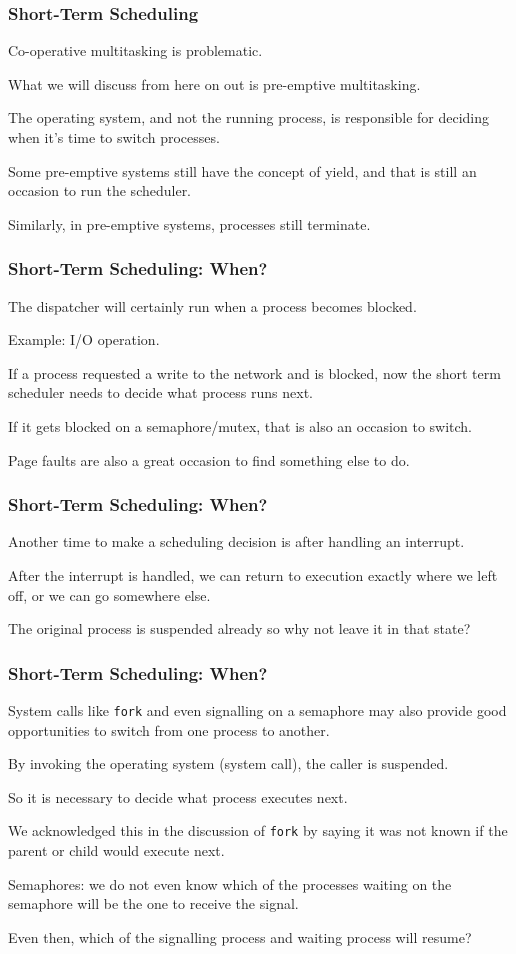 \begin{frame}
\frametitle{Short-Term Scheduling}

Co-operative multitasking is problematic. 

What we will discuss from here on out is \alert{pre-emptive multitasking}.

The operating system, and not the running process, is responsible for deciding when it's time to switch processes. 

Some pre-emptive systems still have the concept of yield, and that is still an occasion to run the scheduler. 

Similarly, in pre-emptive systems, processes still terminate.


\end{frame}

\begin{frame}
\frametitle{Short-Term Scheduling: When?}

The dispatcher will certainly run when a process becomes blocked.

Example: I/O operation. 

If a process requested a write to the network and is blocked, now the short term scheduler needs to decide what process runs next. 

If it gets blocked on a semaphore/mutex, that is also an occasion to switch.

Page faults are also a great occasion to find something else to do.


\end{frame}

\begin{frame}
\frametitle{Short-Term Scheduling: When?}

Another time to make a scheduling decision is after handling an interrupt.

After the interrupt is handled, we can return to execution exactly where we left off, or we can go somewhere else.

The original process is suspended already so why not leave it in that state?

\end{frame}

\begin{frame}
\frametitle{Short-Term Scheduling: When?}

System calls like \texttt{fork} and even signalling on a semaphore may also provide good opportunities to switch from one process to another. 

By invoking the operating system (system call), the caller is suspended.

So it is necessary to decide what process executes next. 

We acknowledged this in the discussion of \texttt{fork} by saying it was not known if the parent or child would execute next. 

Semaphores: we do not even know which of the processes waiting on the semaphore will be the one to receive the signal. 

Even then, which of the signalling process and waiting process will resume?


\end{frame}

